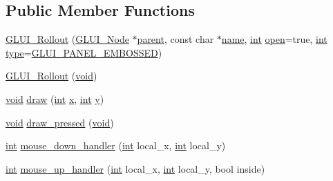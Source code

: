 \subsection*{Public Member Functions}
\begin{DoxyCompactItemize}
\item 
\hyperlink{class_g_l_u_i___rollout_a24c6af54874ab79245debf924048bee2}{G\+L\+U\+I\+\_\+\+Rollout} (\hyperlink{class_g_l_u_i___node}{G\+L\+U\+I\+\_\+\+Node} $\ast$\hyperlink{class_g_l_u_i___node_a8ed65d447784f6f88bd3e2e2bcac6cdb}{parent}, const char $\ast$\hyperlink{glext_8h_ad977737dfc9a274a62741b9500c49a32}{name}, \hyperlink{wglext_8h_a500a82aecba06f4550f6849b8099ca21}{int} \hyperlink{class_g_l_u_i___rollout_a431c2fee6adb56c18d0ed8ac9a01eacb}{open}=true, \hyperlink{wglext_8h_a500a82aecba06f4550f6849b8099ca21}{int} \hyperlink{glext_8h_ab7c1afc09f67635c2c376638fcc0db5f}{type}=\hyperlink{glui_8h_add54979a7b4391067b8a125ee34f690a}{G\+L\+U\+I\+\_\+\+P\+A\+N\+E\+L\+\_\+\+E\+M\+B\+O\+S\+S\+E\+D})
\item 
\hyperlink{class_g_l_u_i___rollout_a998dcde980d47ed464423f7728011290}{G\+L\+U\+I\+\_\+\+Rollout} (\hyperlink{wglext_8h_a9e6b7f1933461ef318bb000d6bd13b83}{void})
\item 
\hyperlink{wglext_8h_a9e6b7f1933461ef318bb000d6bd13b83}{void} \hyperlink{class_g_l_u_i___rollout_ae3ff0bbeb04f22aa5489cf542b6e3fbb}{draw} (\hyperlink{wglext_8h_a500a82aecba06f4550f6849b8099ca21}{int} \hyperlink{glext_8h_ad77deca22f617d3f0e0eb786445689fc}{x}, \hyperlink{wglext_8h_a500a82aecba06f4550f6849b8099ca21}{int} \hyperlink{glext_8h_a9298c7ad619074f5285b32c6b72bfdea}{y})
\item 
\hyperlink{wglext_8h_a9e6b7f1933461ef318bb000d6bd13b83}{void} \hyperlink{class_g_l_u_i___rollout_aa3fbc3548f10ee8209d2eb0b46c05b6d}{draw\+\_\+pressed} (\hyperlink{wglext_8h_a9e6b7f1933461ef318bb000d6bd13b83}{void})
\item 
\hyperlink{wglext_8h_a500a82aecba06f4550f6849b8099ca21}{int} \hyperlink{class_g_l_u_i___rollout_abbd554515b6f0136f6aa89d260b826e5}{mouse\+\_\+down\+\_\+handler} (\hyperlink{wglext_8h_a500a82aecba06f4550f6849b8099ca21}{int} local\+\_\+x, \hyperlink{wglext_8h_a500a82aecba06f4550f6849b8099ca21}{int} local\+\_\+y)
\item 
\hyperlink{wglext_8h_a500a82aecba06f4550f6849b8099ca21}{int} \hyperlink{class_g_l_u_i___rollout_ac7df2e007640c4a21deb494c8eb8ca03}{mouse\+\_\+up\+\_\+handler} (\hyperlink{wglext_8h_a500a82aecba06f4550f6849b8099ca21}{int} local\+\_\+x, \hyperlink{wglext_8h_a500a82aecba06f4550f6849b8099ca21}{int} local\+\_\+y, bool inside)

\end{DoxyCompactItemize}
